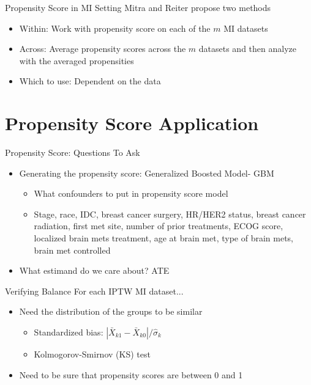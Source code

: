 \begin{frame}{Propensity Score in MI Setting}
  Mitra and Reiter propose two methods \cite{Mitra2012}
 \begin{itemize}
 
 \item Within: Work with propensity score on each of the $m$ MI datasets
 \item Across: Average propensity scores across the $m$ datasets and then analyze with the averaged propensities 
  \item Which to use: Dependent on the data

 \end{itemize}

\end{frame}

\section{Propensity Score Application}
\begin{frame}{Propensity Score: Questions To Ask}
\begin{itemize}
\item Generating the propensity score: Generalized Boosted Model- GBM
\begin{itemize}
\item What confounders to put in propensity score model
  \item Stage, race, IDC, breast cancer surgery, HR/HER2 status,
  breast cancer radiation, first met site, number of prior treatments, ECOG score,
  localized brain mets treatment, age at brain met, type of brain mets, brain met controlled
\end{itemize}
\item What estimand do we care about? ATE
\end{itemize} 
\end{frame}



\begin{frame}{Verifying Balance}
For each IPTW MI dataset...
\begin{itemize}
\item Need the distribution of the groups to be similar
\begin{itemize}
\item Standardized bias: $|\bar{X}_{k1}-\bar{X}_{k0}|/ \hat{\sigma}_k$
\item Kolmogorov-Smirnov (KS) test 
\end{itemize}
\item Need to be sure that propensity scores are between 0 and 1
\end{itemize}
\end{frame}


